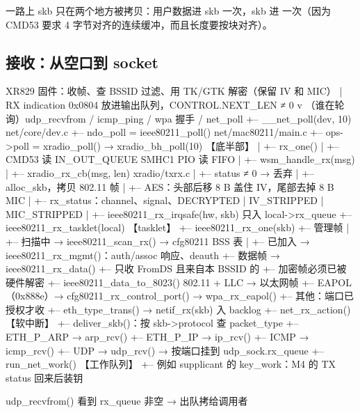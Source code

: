 一路上 skb 只在两个地方被拷贝：用户数据进 skb 一次，skb 进  一次（因为 CMD53 要求 4 字节对齐的连续缓冲，而且长度要按块对齐）。

\subsection{接收：从空口到 socket}

\begin{txtcode}[basicstyle=\ttfamily\scriptsize]
XR829 固件：收帧、查 BSSID 过滤、用 TK/GTK 解密（保留 IV 和 MIC）
  | RX indication 0x0804 放进输出队列，CONTROL.NEXT_LEN ≠ 0
  v
（谁在轮询）udp_recvfrom / icmp_ping / wpa 握手 / net_poll
  +-- __net_poll(dev, 10)                         net/core/dev.c
      +-- ndo_poll = ieee80211_poll()             net/mac80211/main.c
          +-- ops->poll = xradio_poll() → xradio_bh_poll(10)        【底半部】
          |   +-- rx_one()
          |       +-- CMD53 读 IN_OUT_QUEUE      SMHC1 PIO 读 FIFO
          |       +-- wsm_handle_rx(msg)
          |           +-- xradio_rx_cb(msg, len)                     xradio/txrx.c
          |               +-- status ≠ 0 → 丢弃
          |               +-- alloc_skb，拷贝 802.11 帧
          |               +-- AES：头部后移 8 B 盖住 IV，尾部去掉 8 B MIC
          |               +-- rx_status：channel、signal、DECRYPTED | IV_STRIPPED | MIC_STRIPPED
          |               +-- ieee80211_rx_irqsafe(hw, skb)          只入 local->rx_queue
          +-- ieee80211_rx_tasklet(local)                           【tasklet】
              +-- ieee80211_rx_one(skb)
                  +-- 管理帧
                  |   +-- 扫描中 → ieee80211_scan_rx() → cfg80211 BSS 表
                  |   +-- 已加入 → ieee80211_rx_mgmt()：auth/assoc 响应、deauth
                  +-- 数据帧 → ieee80211_rx_data()
                      +-- 只收 FromDS 且来自本 BSSID 的
                      +-- 加密帧必须已被硬件解密
                      +-- ieee80211_data_to_8023()    802.11 + LLC → 以太网帧
                      +-- EAPOL（0x888e）→ cfg80211_rx_control_port() → wpa_rx_eapol()
                      +-- 其他：端口已授权才收
                          +-- eth_type_trans() → netif_rx(skb)       入 backlog
      +-- net_rx_action()                                            【软中断】
          +-- deliver_skb()：按 skb->protocol 查 packet_type
              +-- ETH_P_ARP → arp_rcv()
              +-- ETH_P_IP  → ip_rcv()
                  +-- ICMP → icmp_rcv()
                  +-- UDP  → udp_rcv() → 按端口挂到 udp_sock.rx_queue
      +-- run_net_work()                                             【工作队列】
          +-- 例如 supplicant 的 key_work：M4 的 TX status 回来后装钥

udp_recvfrom() 看到 rx_queue 非空 → 出队拷给调用者
\end{txtcode}

